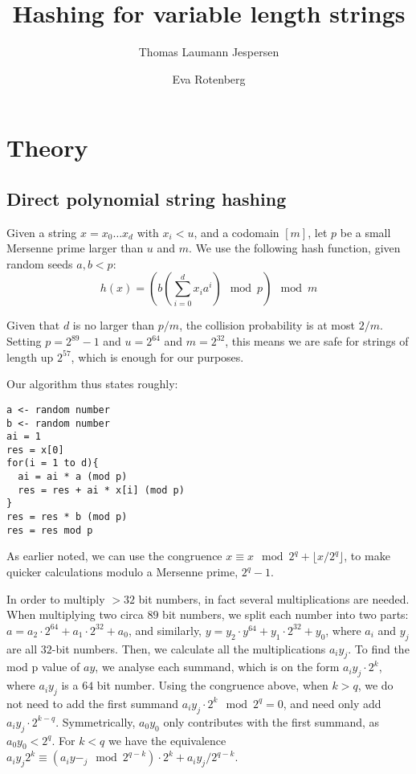 \documentclass[]{article}
\title{Hashing for variable length strings}
\author{Thomas Laumann Jespersen \and Eva Rotenberg}
\begin{document}
\maketitle

\section{Theory}

\subsection*{Direct polynomial string hashing}

Given a string $x=x_0 \ldots x_d$ with $x_i < u$, and a codomain $[m]$, let $p$ be a small Mersenne prime larger than $u$ and $m$. We use the following hash function, given random seeds $a,b < p$:
\[h(x)= \left( b \left( \sum_{i=0}^{d}x_i a^i \right) \mod p \right) \mod m \]

Given that $d$ is no larger than $p/m$, the collision probability is at most $2/m$. Setting $p=2^{89}-1$ and $u=2^{64}$ and $m=2^{32}$, this means we are safe for strings of length up $2^{57}$, which is enough for our purposes.

Our algorithm thus states roughly:

\begin{verbatim}
a <- random number
b <- random number
ai = 1
res = x[0]
for(i = 1 to d){
  ai = ai * a (mod p)
  res = res + ai * x[i] (mod p)
}
res = res * b (mod p)
res = res mod p
\end{verbatim}

As earlier noted, we can use the congruence $x \equiv x\mod 2^q + \lfloor x / 2^q \rfloor$, to make quicker calculations modulo a Mersenne prime, $2^q -1$.

In order to multiply $>32$ bit numbers, in fact several multiplications are needed. When multiplying two circa $89$ bit numbers, we split each number into two parts: $a = a_2\cdot 2^{64} + a_1 \cdot 2^{32} + a_0$, and similarly, $y = y_2\cdot y^{64} + y_1 \cdot 2^{32} + y_0$, where $a_i$ and $y_j$ are all $32$-bit numbers. Then, we calculate all the multiplications $a_i y_j$. To find the mod p value of $ay$, we analyse each summand, which is on the form $a_i y_j \cdot 2^{k}$, where $a_i y_j$ is a $64$ bit number. Using the congruence above, when $k>q$, we do not need to add the first summand $a_i y_j \cdot 2^k \mod 2^q = 0$, and need only add $a_i y_j \cdot 2^{k-q}$. Symmetrically, $a_0 y_0$ only contributes with the first summand, as $a_0 y_0 < 2^q$. For $k<q$ we have the equivalence $a_i y_j 2^k \equiv (a_i y-_j \mod 2^{q-k})\cdot 2^k + a_i y_j / 2^{q-k}$.
\end{document}

